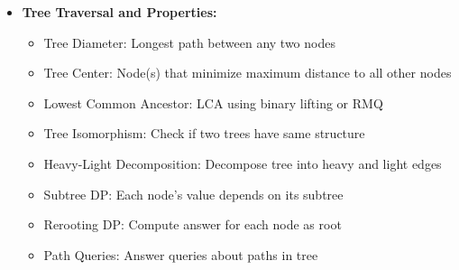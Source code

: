 \documentclass[a4paper,10pt]{book}
\begin{document}
\begin{itemize}[leftmargin=*]
    \item \textbf{Tree Traversal and Properties:}
    \begin{itemize}
        \item Tree Diameter: Longest path between any two nodes
        \item Tree Center: Node(s) that minimize maximum distance to all other nodes
        \item Lowest Common Ancestor: LCA using binary lifting or RMQ
        \item Tree Isomorphism: Check if two trees have same structure
        \item Heavy-Light Decomposition: Decompose tree into heavy and light edges
    \end{itemize}

    \begin{itemize}
        \item Subtree DP: Each node's value depends on its subtree
        \item Rerooting DP: Compute answer for each node as root
        \item Path Queries: Answer queries about paths in tree
        
    \end{itemize}
\end{itemize}
\end{document}
